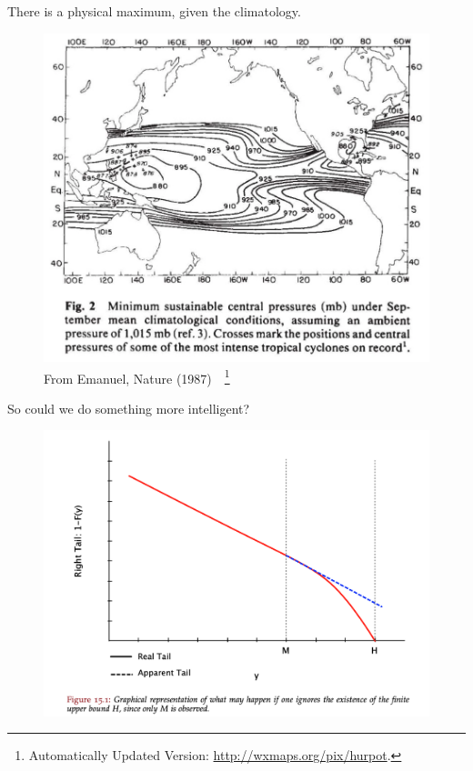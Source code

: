 \begin{frame}{There is a physical maximum, given the climatology.}

\vspace{-30pt}
\begin{figure}[htb!]
    \centering
    \includegraphics[width=0.8\linewidth]{images/hurricane-Emanuel-upper-bound.png}
    \vspace{-15pt}
   \caption{From Emanuel, Nature (1987)~\cite{emanuel1987dependence}~\footnote{Automatically Updated Version: \url{http://wxmaps.org/pix/hurpot}.} }
    \label{fig:}
\end{figure}
\end{frame}

\begin{frame}{So could we do something more intelligent?~\cite{taleb2019statistical}}
\vspace{-20pt}
 \begin{minipage}{1.0\textwidth}
\begin{figure}[htb!]
    \centering
    \includegraphics[width=1\linewidth]{images/nnt-upper-bound.png}
    \vspace{-15pt}

\end{figure}
\end{minipage}
\end{frame}

